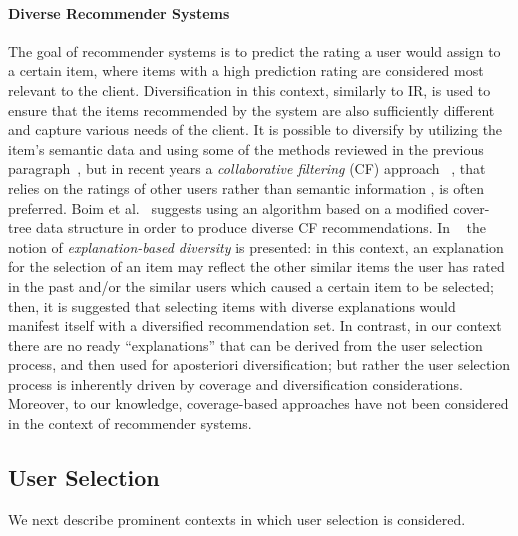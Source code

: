 \paragraph*{Diverse Recommender Systems}
The goal of recommender systems is to predict the rating a user would assign to a certain item, where items with a high prediction rating are considered most relevant to the client. Diversification in this context, similarly to IR, is used to ensure that the items recommended by the system are also sufficiently different and capture various needs of the client. It is possible to diversify by utilizing the item's semantic data and using some of the methods 
reviewed in the previous paragraph~\cite{servajean2013profile}, but in recent years a \emph{collaborative filtering} (CF) approach ~\cite{su2009cfsurvey}, that relies on the ratings of other users rather than semantic information , is often preferred. Boim et al.~\cite{boim2011priori} suggests using an algorithm based on a modified cover-tree data structure in order to produce diverse CF recommendations. In ~\cite{yu2009variety} the notion of \emph{explanation-based diversity} is presented: in this context, an explanation for the selection of an item may reflect the other similar items the user has rated in the past and/or the similar users which caused a certain item to be selected; then, it is suggested that selecting items with diverse explanations would manifest itself with a diversified recommendation set. In contrast, in our context there are no ready ``explanations'' that can be derived from the user selection process, and then used for aposteriori diversification; but rather the user selection process is inherently driven by coverage and diversification considerations. Moreover, to our knowledge, coverage-based approaches have not been considered in the context of recommender systems.  

\subsection{User Selection}
We next describe prominent contexts in which user selection is considered.

